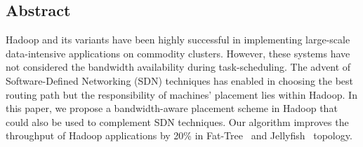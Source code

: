 \subsection*{Abstract}

Hadoop and its variants have been highly successful in implementing large-scale
data-intensive applications on commodity clusters. However, these systems have
not considered the bandwidth availability during task-scheduling. The advent of
Software-Defined Networking (SDN) techniques has enabled in choosing the best
routing path but the responsibility of machines' placement lies within Hadoop.
In this paper, we propose a bandwidth-aware placement scheme in Hadoop that
could also be used to complement SDN techniques.  Our algorithm improves the
throughput of Hadoop applications by 20\% in Fat-Tree~\cite{fattree1985} and
Jellyfish~\cite{jellyfish2012} topology.

